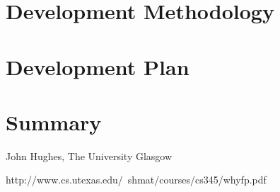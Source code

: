 \documentclass[11pt]{article} %
\begin{document}
\section{Development Methodology}


\section{Development Plan}


\section{Summary}


\begin{thebibliography}{99}
	John Hughes, The University Glasgow
\end{thebibliography}
http://www.cs.utexas.edu/~shmat/courses/cs345/whyfp.pdf
\end{document}
